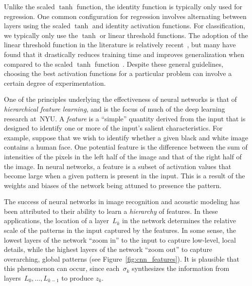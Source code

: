 \documentclass[11pt,a4paper]{article}
\numberwithin{equation}{section}
\begin{document}
Unlike the scaled $\tanh$ function, the identity function is typically only used
for regression. One common configuration for regression involves alternating
between layers using the scaled $\tanh$ and identity activation functions. For
classification, we typically only use the $\tanh$ or linear threshold functions.
The adoption of the linear threshold function in the literature is relatively
recent~\citep{nair2010rectified}, but many have found that it drastically
reduces training time and improves generalization when compared to the scaled
$\tanh$ function~\citep{krizhevsky2012imagenet}. Despite these general
guidelines, choosing the best activation functions for a particular problem can
involve a certain degree of experimentation.

One of the principles underlying the effectiveness of neural networks is that of
\emph{hierarchical feature learning}, and is the focus of much of the deep
learning research at~NYU. A \emph{feature} is a ``simple'' quantity derived from
the input that is designed to identify one or more of the input's salient
characteristics. For example, suppose that we wish to identify whether a given
black and white image contains a human face. One potential feature is the
difference between the sum of intensities of the pixels in the left half of the
image and that of the right half of the image. In neural networks, a feature is
a subset of activation values that become large when a given pattern is present
in the input. This is a result of the weights and biases of the network being
attuned to presence the pattern.

The success of neural networks in image recognition and acoustic modeling has
been attributed to their ability to learn a \emph{hierarchy} of features. In
these applications, the location of a layer~$L_k$ in the network determines the
relative scale of the patterns in the input captured by the features. In some
sense, the lowest layers of the network ``zoom in'' to the input to capture
low-level, local details, while the highest layers of the network ``zoom out''
to capture overarching, global patterns (see Figure~\ref{fig:cnn_features}). It
is plausible that this phenomenon can occur, since each~$\sigma_k$ synthesizes
the information from layers~$L_0, \ldots, L_{k - 1}$ to produce $z_k$.

\end{document}
